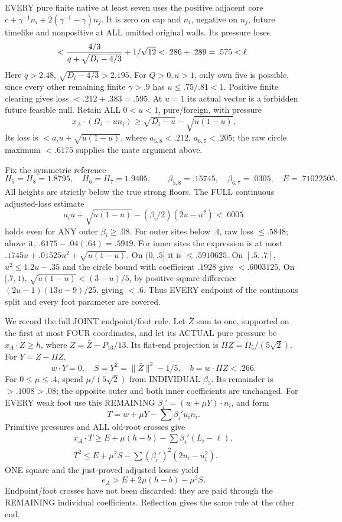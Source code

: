\documentclass[11pt]{article}
\begin{document}
EVERY pure finite native at least seven uses
the positive adjacent core
\(c+\gamma^{-1}n_i+2(\gamma^{-1}-\gamma)n_j\).
It is zero on cap and \(n_i\), negative on
\(n_j\), future timelike and nonpositive at
ALL omitted original walls.
Its pressure loses
\[
       <{4/3\over q+\sqrt{D_i-4/3}}+1/\sqrt{12}
                        <.286+.289=.575<\ell .
\]
Here \(q>2.48\),
\(\sqrt{D_i-4/3}>2.195\).
For \(Q>0,u>1\), only own five is possible,
since every other remaining finite \(\gamma>.9\)
has \(u\le.75/.81<1\).
Positive finite clearing gives loss
\(<.212+.383=.595\).
At \(u=1\) its actual vector is a forbidden
future feasible null.
Retain ALL \(0<u<1\), pure/foreign, with pressure
\[
 x_A\cdot(\Omega_i-un_i)\ge
                   \sqrt{D_i-u}-\sqrt{u(1-u)} .
\]
Its loss is \(<a_i u+\sqrt{u(1-u)}\), where
\(a_{5,8}<.212\), \(a_{6,7}<.205\);
the raw circle maximum \(<.6175\) supplies
the mate argument above.

Fix the symmetric reference
\[
 H_5=H_8=1.8795,\quad H_6=H_7=1.9405,\qquad
 \beta_{5,8}=.15745,\quad\beta_{6,7}=.0305,
 \quad E=.71022505 .
\]
All heights are strictly below the true
strong floors.
The FULL continuous adjusted-loss estimate
\[
 a_i u+\sqrt{u(1-u)}-(\beta_i/2)(2u-u^2)<.6005
\]
holds even for ANY outer \(\beta_i\ge.08\).
For outer sites below \(.4\), raw loss
\(\le.5848\); above it,
\(.6175-.04(.64)=.5919\).
For inner sites the expression is at most
\(.1745u+.01525u^2+\sqrt{u(1-u)}\).
On \((0,.5]\) it is \(\le.5910625\).
On \([.5,.7]\), \(u^2\le1.2u-.35\)
and the circle bound with coefficient \(.1928\)
give \(<.6003125\).
On \([.7,1)\),
\(\sqrt{u(1-u)}<(3-u)/5\),
by positive square difference
\((2u-1)(13u-9)/25\), giving \(<.6\).
Thus EVERY endpoint of the continuous split
and every foot parameter are covered.

We record the full JOINT endpoint/foot rule.
Let \(\bar Z\) sum to one, supported on the
first at most FOUR coordinates, and let its
ACTUAL pure pressure be \(x_A\cdot Z\ge h\),
where \(Z=\bar Z-P_{13}/13\).
Its flat-end projection is
\(\Pi Z=\Omega_5/(5\sqrt2)\).
For \(Y=Z-\Pi Z\),
\[
 w\cdot Y=0,\quad S=Y^2=\|\bar Z\|^2-1/5,\quad
                         b=w\cdot\Pi Z<.266 .
\]
For \(0\le\mu\le.4\), spend
\(\mu/(5\sqrt2)\) from INDIVIDUAL \(\beta_5\).
Its remainder is \(>.1008>.08\); the opposite
outer and both inner coefficients are unchanged.
For EVERY weak foot use this REMAINING
\(\beta_i'=(w+\mu Y)\cdot n_i\), and form
\[
                    T=w+\mu Y-\sum\beta_i' u_i n_i .
\]
Primitive pressures and ALL old-root crosses give
\[
 \begin{gathered}
 x_A\cdot T\ge E+\mu(h-b)-\sum\beta_i'(L_i-\ell),\\
 T^2\le E+\mu^2S-\sum(\beta_i')^2(2u_i-u_i^2).
 \end{gathered}
\]
ONE square and the just-proved adjusted losses
yield
\[
                           e_A>E+2\mu(h-b)-\mu^2S .
\tag{A12P}\label{eq:arithA12endpointpayment}
\]
Endpoint/foot crosses have not been discarded:
they are paid through the REMAINING individual
coefficients.
Reflection gives the same rule at the other end.
\end{document}
